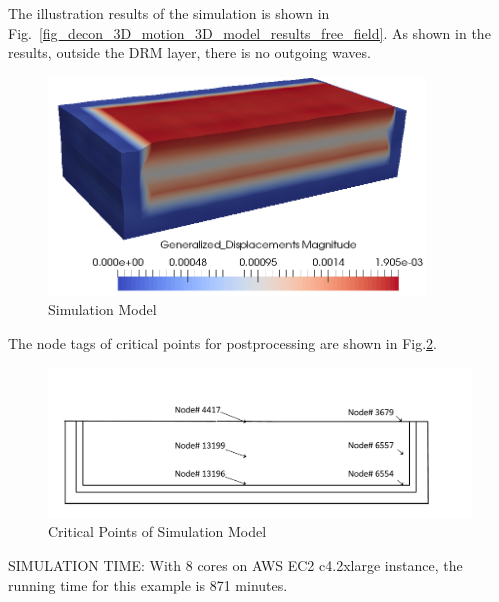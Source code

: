 The illustration results of the simulation is shown in Fig.~\ref{fig_decon_3D_motion_3D_model_results_free_field}.
As shown in the results, outside the DRM layer, there is no outgoing waves. 

\begin{figure}[H]
  \centering
  \includegraphics[width = 10cm]{./Figure-files/nonlinear_analysis_steps/free_field_3D/motion3D_DRM3D_free_field.png}
  \caption{Simulation Model}
  \label{fig_nonlinear_steps_D_motion_3D_model_results_free_field}
\end{figure}


The node tags of critical points for postprocessing are shown in Fig.\ref{fig_points_soil_foundation}.

\begin{figure}[H]
  \centering
  \includegraphics[width = 12cm]{./Figure-files/nonlinear_analysis_steps/free_field_3D/free_field_3D_node_location.pdf}
  \caption{Critical Points of Simulation Model}
  \label{fig_points_soil_foundation}
\end{figure}

SIMULATION TIME: With 8 cores on AWS EC2 c4.2xlarge instance, the running time for this example is 871 minutes.



